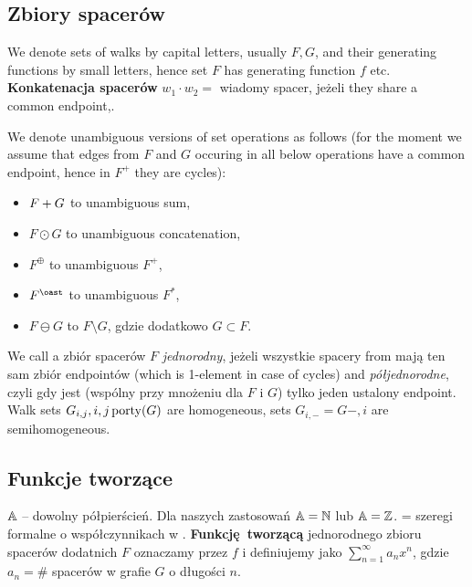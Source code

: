 \begin{df}
\subsection{Zbiory spacerów}
We denote sets of walks by capital letters, usually $F, G$, and their generating functions by small letters, hence set $F$ has generating function $f$ etc.
\\
\textbf{Konkatenacja spacerów} $w_1 \cdot w_2 = $ wiadomy spacer, jeżeli they share a common endpoint,.
\begin{df}
	We denote unambiguous versions of set operations as follows (for the moment we assume that edges from $F$ and $G$ occuring in all below operations have a common endpoint, hence in $F^{+}$ they are cycles):
	\begin{itemize}
		\item $F + G $ to unambiguous sum,
		\item $F \odot G$ to unambiguous concatenation,
		\item $F^\oplus $ to unambiguous $F^+$,
		\item $F^\oast $ to unambiguous $F^*$,
		\item $F\ominus G$ to $F\setminus G$, gdzie dodatkowo $G\subset F$. 
	\end{itemize}
\end{df}
	We call a zbiór spacerów $F$ \emph{jednorodny}, jeżeli wszystkie spacery from mają ten sam zbiór endpointów (which is 1-element in case of cycles) and \emph{półjednorodne},  czyli gdy jest (wspólny przy mnożeniu dla $F$ i $G$) tylko jeden ustalony endpoint.
	Walk sets $G_{i,j}, i,j\operatorname{porty}(G)$ are homogeneous, sets $G_{i, -} = G{-, i}$ are semihomogeneous.
%
\subsection{Funkcje tworzące}
$\mathbb{A}$ -- dowolny półpierścień. Dla naszych zastosowań $\mathbb{A} = \mathbb{N} $ lub $\mathbb{A} = \mathbb{Z}$. 	\Ax = szeregi formalne o współczynnikach w \A.
\textbf{Funkcję tworzącą} jednorodnego zbioru spacerów dodatnich $F$ oznaczamy przez $f$ i definiujemy jako $\sum_{n=1}^{\infty} a_n x^n$, gdzie $a_n = \#$ spacerów w grafie $G$ o długości $n$.




\end{df}
